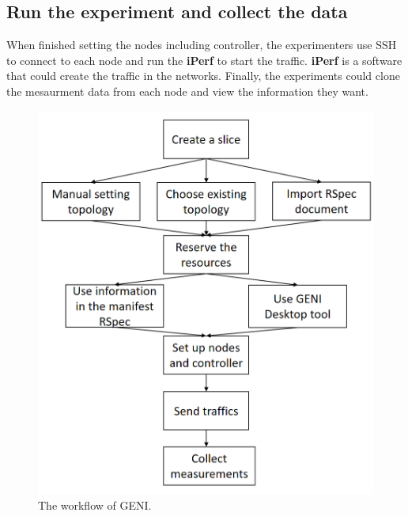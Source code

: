 \documentclass[a4paper,12pt]{report}
\begin{document}
\begin{CJK*}{UTF8}{bkai}
\begin{large}
     \subsection{Run the experiment and collect the data}
     \qquad When finished setting the nodes including controller, the experimenters use SSH to connect to each node and run the {\bf iPerf} to start the traffic. {\bf iPerf}  \cite{iperf} is a software that could create the traffic in the networks.
     \newline
     \null\qquad Finally, the experiments could clone the mesaurment data from each node and view the information they want.
       \begin{figure}
          \caption{The workflow of GENI.}
          \centering
          \includegraphics[width=1.0\textwidth]{geni_workflow.png}
       \end{figure}

\end{large}
\end{CJK*}
\end{document}
